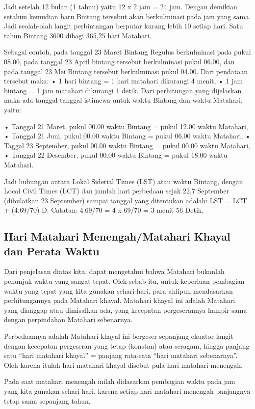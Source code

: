 Jadi setelah 12 bulan (1 tahun) yaitu  12 x 2 jam = 24 jam. Dengan demikian setahun
 kemudian baru Bintang tersebut akan berkulminasi pada jam yang sama. 
 Jadi seolah-olah langit perbintangan berputar kurang lebih 10 setiap hari. 
 Satu tahun Bintang 3600 dibagi 365,25 hari Matahari.

Sebagai contoh, pada tanggal 23 Maret Bintang Regulus berkulminasi pada pukul 08.00,
 pada tanggal 23 April bintang tersebut berkulminasi pukul 06.00, dan pada tanggal 23 Mei 
 Bintang tersebut berkulminasi pukul 04.00. Dari pendataan tersebut maka: 
 • 1 hari bintang = 1 hari matahari dikurangi 4 menit, 
 • 1 jam bintang = 1 jam matahari dikurangi 1 detik. 
 Dari perhitungan yang dijelaskan maka ada tanggal-tanggal istimewa 
 untuk waktu Bintang dan waktu Matahari, yaitu:
 
	• Tanggal 21 Maret, pukul 00.00 waktu Bintang = pukul 12.00 waktu Matahari,
	• Tanggal 21 Juni, pukul 00.00 waktu Bintang = pukul 06.00 waktu Matahari,
	• Taggal 23 September, pukul 00.00 waktu Bintang = pukul 00.00 waktu Matahari,
	• Tanggal 22 Desember, pukul 00.00 waktu Bintang = pukul 18.00 waktu Matahari.
	
 Jadi hubungan antara Lokal Siderial Times (LST) atau waktu Bintang, 
 dengan Local Civil Times (LCT) dan jumlah hari perbedaan sejak 22,7 September 
 (dibulatkan 23 September) sampai tanggal yang ditentukan adalah:
 LST = LCT + (4.69/70) D. Catatan: 4.69/70 = 4 x 69/70 = 3 menit 56 Detik.	
 
\subsection{Hari Matahari Menengah/Matahari Khayal dan Perata Waktu}
 Dari penjelasan diatas kita, dapat mengetahui bahwa Matahari bukanlah penunjuk 
 waktu yang sangat tepat. Oleh sebab itu, untuk keperluan pembagian waktu yang tepat
 yang kita gunakan sehari-hari, para ahlipun mendasarkan perhitungannya pada Matahari
 khayal. Matahari khayal ini adalah Matahari yang dianggap atau dimisalkan ada, 
 yang kecepatan pergeserannya hampir sama dengan perpindahan Matahari sebenarnya.
 
 Perbedaannya adalah Matahari khayal ini bergeser sepanjang ekuator langit 
 dengan kecepatan pergeseran yang tetap (konstan) atau seragam, hingga panjang satu
 “hari matahari khayal” = panjang rata-rata “hari matahari sebenarnya”. 
 Oleh karena itulah hari matahari khayal disebut pula hari matahari menengah.
 
  Pada saat matahari menengah inilah didasarkan pembagian waktu pada jam yang kita gunakan sehari-hari, karena setiap hari matahari menengah panjangnya tetap sama sepanjang tahun.

